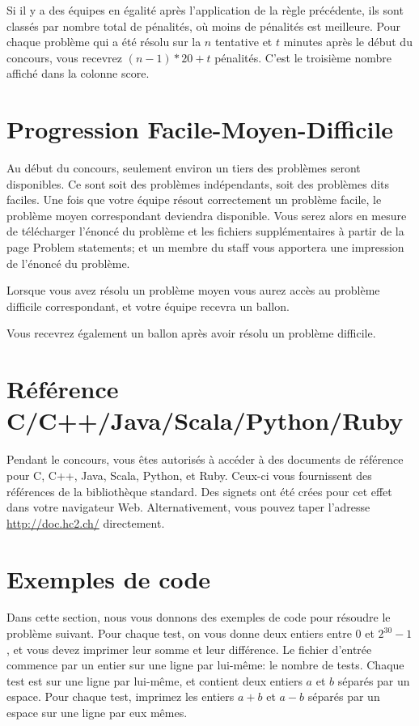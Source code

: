 Si il y a des équipes en égalité après l'application de la règle 
précédente, ils sont classés par nombre total de pénalités, 
où moins de pénalités est meilleure. Pour chaque problème qui 
a été résolu sur la $n$\ieme{} tentative et $t$ minutes après
le début du concours, vous recevrez $(n-1)*20+t$ pénalités.
C'est le troisième nombre affiché dans la colonne \og  score\fg{}.

\section{Progression Facile-Moyen-Difficile}
Au début du concours, seulement environ un tiers des problèmes seront disponibles.
Ce sont soit des problèmes indépendants, soit des problèmes dits \og faciles\fg{}.
Une fois que votre équipe résout correctement un problème \og  facile\fg{},
le problème \og moyen\fg{} correspondant deviendra disponible. 
Vous serez alors en mesure de télécharger l'énoncé du problème 
et les fichiers supplémentaires à partir de la page \og Problem statements\fg{}; 
et un membre du staff vous apportera une impression de l'énoncé 
du problème.

Lorsque vous avez résolu un problème \og  moyen\fg{} vous aurez accès au problème \og  difficile\fg{} correspondant, et votre équipe recevra un ballon.

Vous recevrez également un ballon après avoir résolu un problème \og  difficile\fg{}.

\section{Référence C/C++/Java/Scala/Python/Ruby}
Pendant le concours, vous êtes autorisés à accéder à des documents 
de référence pour C, C++, Java, Scala, Python, et Ruby. Ceux-ci vous fournissent des 
références de la bibliothèque standard.
Des signets ont été crées pour cet effet dans votre navigateur Web. 
Alternativement, vous pouvez taper l'adresse \url{http://doc.hc2.ch/} directement. 

\section{Exemples de code}
\label{codeexamples}

Dans cette section, nous vous donnons des exemples de code pour résoudre
le problème suivant. Pour chaque test, on vous donne deux entiers entre 0
et $2^{30}-1$, et vous devez imprimer leur somme et leur différence.
Le fichier d'entrée commence par un entier sur une ligne par lui-même:
le nombre de tests.
Chaque test est sur une ligne par lui-même, et contient deux entiers $a$ et $b$
séparés par un espace. Pour chaque test, imprimez les entiers
$a+b$ et $a-b$ séparés par un espace sur une ligne par eux mêmes.


